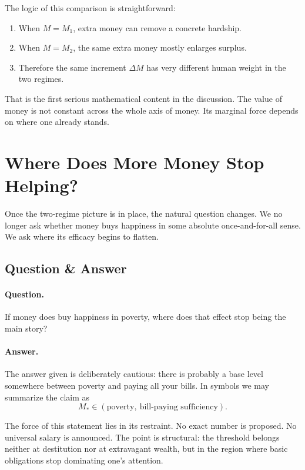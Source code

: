 The logic of this comparison is straightforward:
\begin{enumerate}
\item When \(M=M_1\), extra money can remove a concrete hardship.
\item When \(M=M_2\), the same extra money mostly enlarges surplus.
\item Therefore the same increment \(\Delta M\) has very different human weight in the two regimes.
\end{enumerate}

That is the first serious mathematical content in the discussion. The value of money is not constant across the whole axis of money. Its marginal force depends on where one already stands.

\section{Where Does More Money Stop Helping?}

Once the two-regime picture is in place, the natural question changes. We no longer ask whether money buys happiness in some absolute once-and-for-all sense. We ask where its efficacy begins to flatten.

\subsection{Question \& Answer}

\paragraph{Question.}
If money does buy happiness in poverty, where does that effect stop being the main story?

\paragraph{Answer.}
The answer given is deliberately cautious: there is probably a base level somewhere between poverty and paying all your bills. In symbols we may summarize the claim as
\begin{equation}
M_* \in (\text{poverty},\ \text{bill-paying sufficiency}).
\end{equation}

The force of this statement lies in its restraint. No exact number is proposed. No universal salary is announced. The point is structural: the threshold belongs neither at destitution nor at extravagant wealth, but in the region where basic obligations stop dominating one’s attention.


